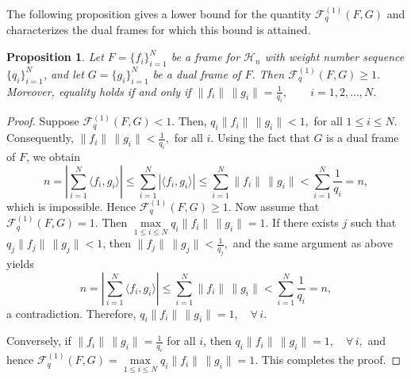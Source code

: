 \documentclass[final,1p,times]{elsarticle}
\newtheorem{prop}[thm]{Proposition}
\begin{document}
The following proposition gives a lower bound for the quantity $\mathcal{F}_{q}^{(1)}(F,G)$ and characterizes the dual frames for which this bound is attained.

\begin{prop}\label{prop2point5}
Let $F=\{f_i\}_{i=1}^N$ be a frame for $\mathcal{H}_n$ with weight number sequence $\{q_i\}_{i=1}^N$, and let $G=\{g_i\}_{i=1}^N$ be a dual frame of $F$. Then
\(
\mathcal{F}_{q}^{(1)}(F,G) \geq 1 .
\)
Moreover, equality holds if and only if
\(
\|f_i\|\,\|g_i\| = \frac{1}{q_i}, \qquad i=1,2,\ldots,N .
\)
\end{prop}

\begin{proof}
Suppose $\mathcal{F}_{q}^{(1)}(F,G) < 1$. Then, $q_i \|f_i\|\,\|g_i\| < 1 ,$ for all $1 \leq i \leq N.$ Consequently, $\|f_i\|\,\|g_i\| < \frac{1}{q_i}, $ for all $ i .$ Using the fact that $G$ is a dual frame of $F$, we obtain
\[
n = \left| \sum_{i=1}^N \langle f_i , g_i \rangle \right|
\le \sum_{i=1}^N |\langle f_i , g_i \rangle|
\le \sum_{i=1}^N \|f_i\|\,\|g_i\|
< \sum_{i=1}^N \frac{1}{q_i}
= n,
\]
which is impossible. Hence $\mathcal{F}_{q}^{(1)}(F,G) \ge 1$. Now assume that $\mathcal{F}_{q}^{(1)}(F,G)=1$. Then $\max\limits_{1\le i\le N} q_i\|f_i\|\,\|g_i\| = 1 .$ If there exists $j$ such that $q_j\|f_j\|\,\|g_j\| < 1$, then $\|f_j\|\,\|g_j\| < \frac{1}{q_j},$
and the same argument as above yields
\[
n
= \left|\sum_{i=1}^N \langle f_i , g_i \rangle \right|
\le \sum_{i=1}^N \|f_i\|\,\|g_i\|
< \sum_{i=1}^N \frac{1}{q_i}
= n,
\]
a contradiction. Therefore, $q_i\|f_i\|\,\|g_i\| = 1, \quad \forall\, i .$


Conversely, if $\|f_i\|\,\|g_i\| = \frac{1}{q_i}$ for all $i$, then $q_i\|f_i\|\,\|g_i\| = 1, \quad \forall\, i,$ and hence
\(
\mathcal{F}_{q}^{(1)}(F,G) = \max\limits_{1\le i\le N} q_i\|f_i\|\,\|g_i\| = 1.
\)
This completes the proof.
\end{proof}
\end{document}
